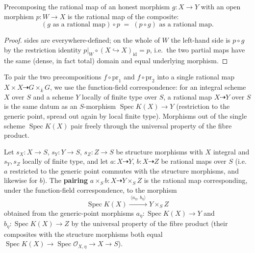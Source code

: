 \begin{lemma}\label{mk-lem:rationalMap_precomp_hom}
  \leanok

  Precomposing the rational map of an honest morphism \(g \colon X \to Y\) with an open
  morphism \(p \colon W \to X\) is the rational map of the composite:
  \[
    (g \text{ as a rational map}) \circ p \;=\; (p \circ g) \text{ as a rational map} .
  \]
\end{lemma}
\begin{proof}
  \leanokBoth sides are everywhere-defined; on the whole of \(W\) the left-hand side is
  \(p \circ g\) by the restriction identity \(p|_{W} \circ (X \hookrightarrow X)_{\mathrm{id}}
  = p\), i.e.\ the two partial maps have the same (dense, in fact total) domain and equal
  underlying morphism.
\end{proof}

To pair the two precompositions \(f \circ \mathrm{pr}_1\) and \(f \circ \mathrm{pr}_2\) into
a single rational map \(X \times X \dashrightarrow G \times_{\bar k} G\), we use the
function-field correspondence: for an integral scheme \(X\) over \(S\) and a scheme \(Y\)
locally of finite type over \(S\), a rational map \(X \dashrightarrow Y\) over \(S\) is the
same datum as an \(S\)-morphism \(\operatorname{Spec} K(X) \to Y\) (restriction to the generic
point, spread out again by local finite type). Morphisms out of the single scheme
\(\operatorname{Spec} K(X)\) pair freely through the universal property of the fibre product.

\begin{definition}\label{mk-def:rationalMap_prod}
  \leanok

  Let \(s_X \colon X \to S\), \(s_Y \colon Y \to S\), \(s_Z \colon Z \to S\) be structure
  morphisms with \(X\) integral and \(s_Y, s_Z\) locally of finite type, and let
  \(a \colon X \dashrightarrow Y\), \(b \colon X \dashrightarrow Z\) be rational maps over
  \(S\) (i.e.\ \(a\) restricted to the generic point commutes with the structure morphisms,
  and likewise for \(b\)). The \textbf{pairing} \(a \times_S b \colon X \dashrightarrow
  Y \times_S Z\) is the rational map corresponding, under the function-field correspondence,
  to the morphism
  \[
    \operatorname{Spec} K(X)
    \xrightarrow{\;\langle a_\eta,\, b_\eta \rangle\;}
    Y \times_S Z
  \]
  obtained from the generic-point morphisms \(a_\eta \colon \operatorname{Spec} K(X) \to Y\)
  and \(b_\eta \colon \operatorname{Spec} K(X) \to Z\) by the universal property of the fibre
  product (their composites with the structure morphisms both equal
  \(\operatorname{Spec} K(X) \to \operatorname{Spec}\mathcal O_{X,\eta} \to X \to S\)).
\end{definition}

